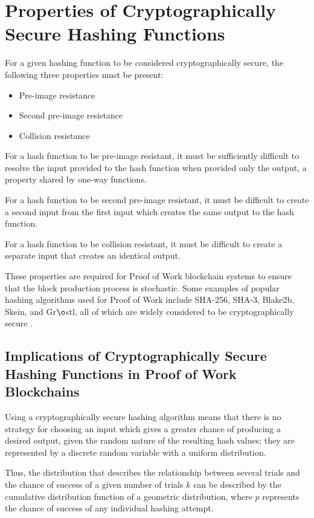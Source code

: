 \documentclass[]{article}
\begin{document}
\section{Properties of Cryptographically Secure Hashing Functions}
For a given hashing function to be considered cryptographically secure, the following three properties \cite{CryptoHashFunctions} must be present: 
\begin{itemize}
	\item Pre-image resistance
	\item Second pre-image resistance
	\item Collision resistance
\end{itemize}

For a hash function to be pre-image resistant, it must be sufficiently difficult to resolve the input provided to the hash function when provided only the output, a property shared by one-way functions.   
\newline 

For a hash function to be second pre-image resistant, it must be difficult to create a second input from the first input which creates the same output to the hash function. 
\newline

For a hash function to be collision resistant, it must be difficult to create a separate input that creates an identical output. 
\newline

These properties are required for Proof of Work blockchain systems to ensure that the block production process is stochastic.  Some examples of popular hashing algorithms used for Proof of Work include SHA-256, SHA-3, Blake2b, Skein, and Gr$\o$stl, all of which are widely considered to be cryptographically secure \cite{CryptoAlgos}. 

\subsection{Implications of Cryptographically Secure Hashing Functions in Proof of Work Blockchains}
Using a cryptographically secure hashing algorithm means that there is no strategy for choosing an input which gives a greater chance of producing a desired output, given the random nature of the resulting hash values; they are represented by a discrete random variable with a uniform distribution.  
\newline

Thus, the distribution that describes the relationship between several trials and the chance of success of a given number of trials $k$ can be described by the cumulative distribution function of a geometric distribution, where $p$ represents the chance of success of any individual hashing attempt.   
\end{document}
